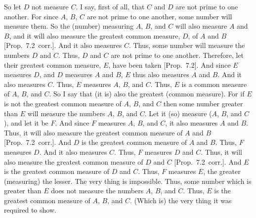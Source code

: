 \begin{Parallel}{}{}
{So let $D$ not measure $C$. I say, first of all, that $C$ and $D$ are not prime
to one another. For since $A$, $B$,  $C$ are not prime to one another,
some number will measure them. So the (number) measuring $A$, $B$, and
$C$ will also measure $A$ and $B$, and it will also measure the greatest common
measure, $D$,  of $A$ and $B$ [Prop.~7.2~corr.].
And it also measures $C$. Thus, some number will measure the numbers $D$ and
$C$. Thus, $D$ and $C$ are not prime to one another. Therefore, let their
greatest common measure, $E$, have been taken  [Prop.~7.2]. And since $E$ measures $D$, and $D$
measures $A$ and $B$, $E$ thus also measures $A$ and $B$. And it also measures $C$.
Thus, $E$ measures $A$, $B$,  and $C$. Thus, $E$ is a common measure of
$A$, $B$,  and $C$. So I say that (it is) also the greatest (common measure).
For if $E$ is not the greatest common measure of $A$, $B$, and $C$ then
some number greater than $E$ will measure the numbers $A$, $B$,  and $C$.
Let it (so) measure ($A$, $B$, and $C$), and let it be $F$. And since $F$
measures $A$, $B$,  and $C$, it also measures $A$ and $B$. 
 Thus, it will also measure the greatest common measure of $A$ and $B$ [Prop.~7.2~corr.]. And $D$ is the greatest common measure
of $A$ and $B$. Thus,  $F$ measures $D$. And it also measures $C$. Thus, $F$
measures $D$ and $C$. Thus, it will also measure the greatest common
measure of $D$ and $C$ [Prop.~7.2~corr.]. And
$E$ is the greatest common measure of $D$ and $C$. Thus, $F$ measures $E$, the
greater (measuring) the lesser. The very thing is impossible. Thus,
some number which is greater than $E$ does not measure the numbers $A$, $B$, and $C$.
Thus, $E$ is the greatest common measure of $A$, $B$, and $C$. (Which is)
the very thing it was required to show.}
\end{Parallel}

